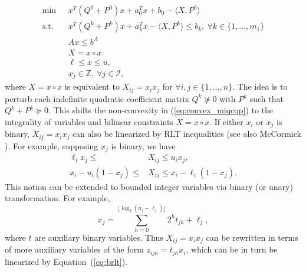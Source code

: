 \documentclass[]{article}
\begin{document}
\begin{subequations}\label{eq:convex_miqcqp}
    \begin{align}
        \min\ &x^T(Q^0 + P^0)x + a_0^Tx + b_0 - \langle X, P^0\rangle\label{eq:cMIQCP_obj}\\
        \mbox{s.t.}\quad &x^T(Q^k + P^k)x + a_k^Tx - \langle X, P^k\rangle \leq b_k,\ \forall k\in\{1,...,m_1\} \label{eq:cMIQCP_qcon}\\
        &Ax \leq b^A\\
        & X = x\circ x \label{eq:cMIQCP_bilinear}\\
        &\ell \leq x \leq u,\\
        &x_j\in \mathbb{Z},\ \forall j\in\mathcal{I},
    \end{align}
\end{subequations}
where $X = x\circ x$ is equivalent to $X_{ij} = x_ix_j$ for $\forall i,j\in\{1,...,n\}$. The idea is to perturb each indefinite quadratic coefficient matrix $Q^k\not\succeq 0$ with $P^k$ such that $Q^k+P^k \succeq 0$. This shifts the non-convexity in (\ref{eq:convex_miqcqp}) to the integrality of variables and bilinear constraints $X=x\circ x$. If either $x_i$ or $x_j$ is binary, $X_{ij} =x_ix_j$ can also be linearized by RLT \cite{sherali2002tight,bestuzheva2024efficient} inequalities  (see also McCormick \cite{mccormick1976computability}). For example, supposing $x_j$ is binary, we have
\begin{equation}\label{eq:brlt}
    \begin{aligned}
        \ell_ix_j\leq &X_{ij} \leq u_ix_j,\\
        x_i - u_i(1-x_j)\leq &X_{ij} \leq x_i - \ell_i(1-x_j).
    \end{aligned}
\end{equation}
This notion can be extended to bounded integer variables via binary (or unary) transformation.  For example,
\begin{equation}\label{eq:bexp}
    x_j = \sum_{h=0}^{\lfloor \log_2(u_j - \ell_j)\rfloor} 2^ht_{jh} + \ell_j,
\end{equation}
where $t$ are auxiliary binary variables. Thus $X_{ij} = x_ix_j$ can be rewritten in terms of more auxiliary variables of the form $z_{ijh} = t_{jh}x_i$, which can be in turn be linearized by Equation~(\ref{eq:brlt}).
\end{document}
